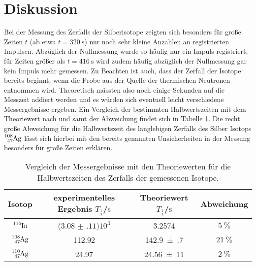 \section{Diskussion}
\label{sec:Diskussion}
Bei der Messung des Zerfalls der Silberisotope zeigten sich besonders für große Zeiten $t$ (ab etwa $t=\SI{320}{\second}$) nur noch sehr kleine Anzahlen an registrierten Impulsen. Abzüglich der Nullmessung wurde so häufig nur ein Impuls registriert, für Zeiten größer als $t=\SI{416}{\second}$ wird zudem häufig abzüglich der Nullmessung gar kein Impuls mehr gemessen.
Zu Beachten ist auch, dass der Zerfall der Isotope bereits beginnt, wenn die Probe aus der Quelle der thermischen Neutronen entnommen wird.
Theoretisch müssten also noch einige Sekunden auf die Messzeit addiert werden und es würden sich eventuell leicht verschiedene Messergebnisse ergeben.
Ein Vergleich der bestimmten Halbwertszeiten mit dem Theoriewert nach \cite{silber} und 
\cite{indium} samt der Abweichung findet sich in Tabelle \ref{tab:theor}. Die recht große Abweichung für die Halbwertszeit des langlebigen Zerfalls des Silber Isotops $\ce{^{108}_47Ag}$ lässt sich hierbei mit den bereits genannten Unsicherheiten in der Messung besonders für große Zeiten erklären.
\begin{table}
  \centering
  \caption{Vergleich der Messergebnisse mit den Theoriewerten für die Halbwertszeiten des Zerfalls der gemessenen Isotope.}
  \label{tab:theor}
  \begin{tabular}{cccc}
  \toprule
  Isotop&experimentelles Ergebnis $T_\frac{1}{2}$/$\si{\second}$&Theoriewert $T_\frac{1}{2}$/$\si{\second}$ &Abweichung\\
  \midrule
	  $\ce{^{116}In}$&($\num{3.08(11)}) 10^3$ & \num{3.2574} & $\SI{5}{\percent}$ \\
  $\ce{^{108}_47Ag}$&\num{112.92}&\num{142.9(7)}&$\SI{21}{\percent}$\\
  $\ce{^{110}_47Ag}$&\num{24.97}&\num{24,56(11)}&$\SI{2}{\percent}$\\
  \bottomrule
  \end{tabular}
\end{table}
